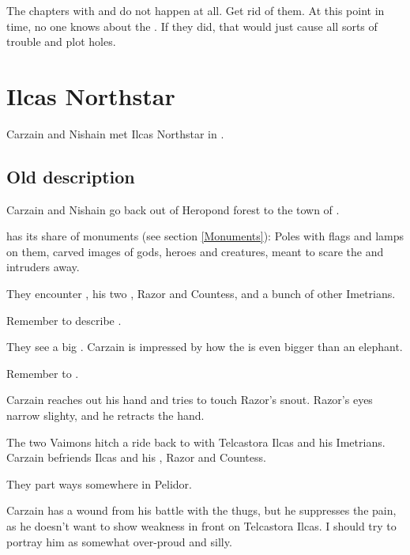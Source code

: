The chapters with \ChyrieEsmerel{} and \LocarPsyrex{} do not happen at all. 
Get rid of them. 
At this point in time, no one knows about the \vertex. 
If they did, that would just cause all sorts of trouble and plot holes. 















\section{Ilcas Northstar}
Carzain and Nishain met Ilcas Northstar in \Bryndwin. 









\subsection{Old description}
Carzain and Nishain go back out of Heropond forest to the town of \Bryndwin.

\Bryndwin has its share of monuments (see section \ref{Monuments}): Poles with flags and lamps on them, carved images of gods, heroes and creatures, meant to scare the \Wylde and intruders away.

They encounter , his two \nycans, Razor and Countess, and a bunch of other Imetrians. 

Remember to describe .

They see a big . Carzain is impressed by how the \mulgron is even bigger than an elephant. 

Remember to .

Carzain reaches out his hand and tries to touch Razor's snout. Razor's eyes narrow slighty, and he retracts the hand. 

The two Vaimons hitch a ride back to \Redglen with Telcastora Ilcas and his Imetrians. Carzain befriends Ilcas and his \nycans, Razor and Countess. 

They part ways somewhere in Pelidor. 

Carzain has a wound from his battle with the thugs, but he suppresses the pain, as he doesn't want to show weakness in front on Telcastora Ilcas. I should try to portray him as somewhat over-proud and silly. 

